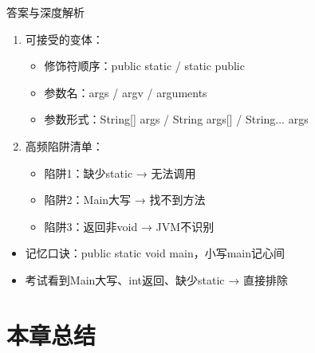 \documentclass[12pt, a4paper]{ctexart}
\begin{document}
\begin{enumerate}[label=\textbf{\arabic*.}]
\begin{bluebox}{答案与深度解析}
\begin{enumerate}
			      \item 可接受的变体：
			            \begin{itemize}
				            \item 修饰符顺序：public static / static public
				            \item 参数名：args / argv / arguments
				            \item 参数形式：String[] args / String args[] / String... args
			            \end{itemize}

			      \item 高频陷阱清单：
			            \begin{itemize}
				            \item 陷阱1：缺少static → 无法调用
				            \item 陷阱2：Main大写 → 找不到方法
				            \item 陷阱3：返回非void → JVM不识别
			            \end{itemize}
		      \end{enumerate}

		      \begin{itemize}
			      \item 记忆口诀：public static void main，小写main记心间
			      \item 考试看到Main大写、int返回、缺少static → 直接排除
		      \end{itemize}
	      \end{bluebox}

\end{enumerate}

\newpage

\section{本章总结}
\end{document}
